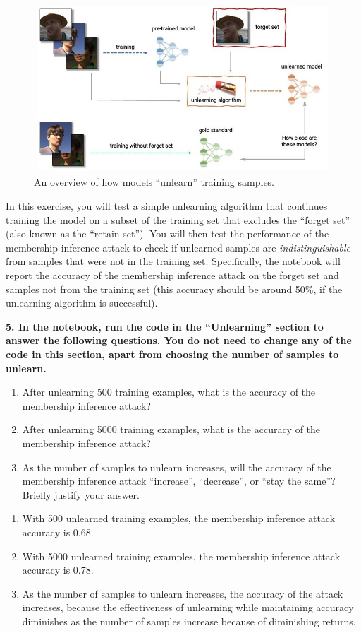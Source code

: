 \documentclass{article}
\begin{document}
\begin{figure}[h!]
\centering
\includegraphics[width=0.75\columnwidth]{Unlearning.jpg}
\caption{An overview of how models ``unlearn'' training samples.}
\label{fig:Unlearning}
\end{figure}

In this exercise, you will test a simple unlearning algorithm that continues training the model on a subset of the training set that excludes the ``forget set'' (also known as the ``retain set''). You will then test the performance of the membership inference attack to check if unlearned samples are \textit{indistinguishable} from samples that were not in the training set. Specifically, the notebook will report the accuracy of the membership inference attack on the forget set and samples not from the training set (this accuracy should be around 50\%, if the unlearning algorithm is successful). 


\textbf{5. In the notebook, run the code in the ``Unlearning'' section to answer the following questions. You do not need to change any of the code in this section, apart from choosing the number of samples to unlearn.}

\begin{enumerate}[label=\Alph*.]
    \item After unlearning 500 training examples, what is the accuracy of the membership inference attack? 
    \item After unlearning 5000 training examples, what is the accuracy of the membership inference attack?
    \item As the number of samples to unlearn increases, will the accuracy of the membership inference attack ``increase'', ``decrease'', or ``stay the same''? Briefly justify your answer.
\end{enumerate}

\bigskip
\begin{mdframed}
\begin{enumerate}[label=\Alph*.]
    \item With 500 unlearned training examples, the membership inference attack accuracy is 0.68.
    \item With 5000 unlearned training examples, the membership inference attack accuracy is 0.78.
    \item As the number of samples to unlearn increases, the accuracy of the attack increases, because the effectiveness of unlearning while maintaining accuracy diminishes as the number of samples increase because of diminishing returns. 
\end{enumerate}
\end{mdframed}
\end{document}
